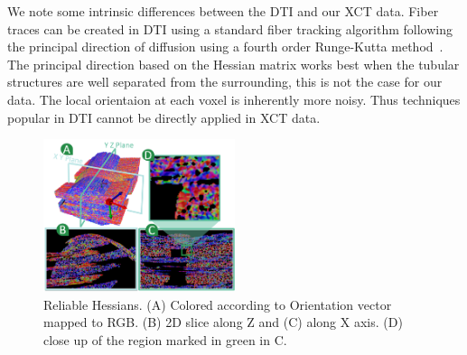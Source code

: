  
We note some intrinsic differences between the DTI and our XCT data. Fiber traces can be created in DTI using a standard fiber tracking algorithm following the principal direction of diffusion using a fourth order Runge-Kutta method~\cite{Brun2003}. The principal direction based on the Hessian matrix works best when the tubular structures are well separated from the surrounding, this is not the case for our data. The local orientaion at each voxel is inherently more noisy. Thus techniques popular in DTI cannot be directly applied in XCT data.

%
\begin{figure}[tb]
\centering
\includegraphics[width=0.5\textwidth]{imagesMT2014/image2}
\caption{Reliable Hessians. (A) Colored according to Orientation vector mapped to RGB. (B) 2D slice along Z and (C) along X axis. (D) close up of the region marked in green in C.}
\label{fig:reliable_hessian}
\end{figure}


